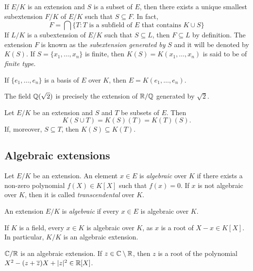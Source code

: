 If $E/K$ is an extension and $S$ is a subset of $E$, then
there exists a unique smallest 
subextension $F/K$ of $E/K$ such that
$S\subseteq F$. In fact, 
\[
	F=\bigcap\{T:\text{$T$ is a subfield of $E$ that contains $K\cup S$}\} 
\]
If $L/K$ is a subextension of $E/K$ such that 
$S\subseteq L$, then $F\subseteq L$ by definition. The 
extension $F$ is known as the \emph{subextension generated by} 
$S$ and
it will be denoted by $K(S)$. 
If $S=\{x_1,\dots,x_n\}$ is finite,
then $K(S)=K(x_1,\dots,x_n)$ is said to be of \emph{finite type}. 

\begin{example}
	If $\{e_1,\dots,e_n\}$ is a basis of $E$ over $K$, 
	then $E=K(e_1,\dots,e_n)$. 
\end{example}

\begin{example}
	The field $\mathbb{Q}(\sqrt{2})$ is precisely the extension 
	of $\mathbb{R}/\mathbb{Q}$ generated by $\sqrt{2}$. 
\end{example}

Let $E/K$ be an extension and $S$ and $T$ be subsets of $E$.
Then 
\[
	K(S\cup T)=K(S)(T)=K(T)(S).
\]
If, moreover, 
$S\subseteq T$, then $K(S)\subseteq K(T)$. 

\subsection{Algebraic extensions}

\begin{definition}
	Let $E/K$ be an extension. An element $x\in E$
	is \emph{algebraic} over $K$ if there
	exists a non-zero polynomial 
	$f(X)\in K[X]$ such that $f(x)=0$. If $x$ is
	not algebraic over $K$, 
	then it is called \emph{transcendental} over $K$.
\end{definition}

\begin{definition}	
	An extension $E/K$ is \emph{algebraic} if 
	every $x\in E$ is algebraic over $K$. 
\end{definition}

If $K$ is a field, every $x\in K$ is algebraic over $K$,
as $x$ is a root of $X-x\in K[X]$. In particular, $K/K$ is
an algebraic extension. 

\begin{example}
	$\mathbb{C}/\mathbb{R}$ is an algebraic extension. If $z\in\mathbb{C}\setminus\mathbb{R}$, then
	$z$ is a root of the polynomial 
	$X^2-(z+\overline{z})X+|z|^2\in\mathbb{R}[X]$. 
\end{example}

